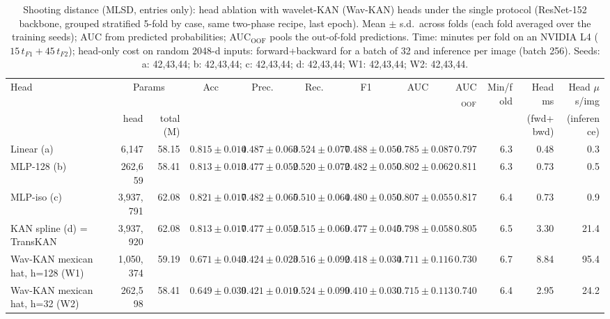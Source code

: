 \begin{table}[t]
\centering
\caption{Shooting distance (MLSD, entries only): head ablation with wavelet-KAN (Wav-KAN) heads under the single protocol (ResNet-152 backbone, grouped stratified 5-fold by case, same two-phase recipe, last epoch). Mean $\pm$ s.d.\ across folds (each fold averaged over the training seeds); AUC from predicted probabilities; AUC$_{\mathrm{OOF}}$ pools the out-of-fold predictions. Time: minutes per fold on an NVIDIA L4 ($15\,t_{F1}+45\,t_{F2}$); head-only cost on random 2048-d inputs: forward+backward for a batch of 32 and inference per image (batch 256). Seeds: a: 42,43,44; b: 42,43,44; c: 42,43,44; d: 42,43,44; W1: 42,43,44; W2: 42,43,44.}
\label{tab:wavkan_dist}
\scriptsize
\setlength{\tabcolsep}{3pt}
\begin{tabular}{lrrcccccrrrr}
\hline
Head & \multicolumn{2}{c}{Params} & Acc & Prec. & Rec. & F1 & AUC & AUC$_{\mathrm{OOF}}$ & Min/fold & Head ms & Head $\mu$s/img \\
 & head & total (M) & & & & & & & & (fwd+bwd) & (inference) \\
\hline
Linear (a) & 6{,}147 & 58.15 & $0.815 \pm 0.014$ & $0.487 \pm 0.063$ & $0.524 \pm 0.077$ & $0.488 \pm 0.056$ & $0.785 \pm 0.087$ & 0.797 & 6.3 & 0.48 & 0.3 \\
MLP-128 (b) & 262{,}659 & 58.41 & $0.813 \pm 0.013$ & $0.477 \pm 0.052$ & $0.520 \pm 0.072$ & $0.482 \pm 0.050$ & $0.802 \pm 0.062$ & 0.811 & 6.3 & 0.73 & 0.5 \\
MLP-iso (c) & 3{,}937{,}791 & 62.08 & $0.821 \pm 0.017$ & $0.482 \pm 0.065$ & $0.510 \pm 0.064$ & $0.480 \pm 0.050$ & $0.807 \pm 0.055$ & 0.817 & 6.4 & 0.73 & 0.9 \\
KAN spline (d) = TransKAN & 3{,}937{,}920 & 62.08 & $0.813 \pm 0.017$ & $0.477 \pm 0.052$ & $0.515 \pm 0.069$ & $0.477 \pm 0.045$ & $0.798 \pm 0.058$ & 0.805 & 6.5 & 3.30 & 21.4 \\
Wav-KAN mexican hat, h=128 (W1) & 1{,}050{,}374 & 59.19 & $0.671 \pm 0.043$ & $0.424 \pm 0.023$ & $0.516 \pm 0.092$ & $0.418 \pm 0.034$ & $0.711 \pm 0.116$ & 0.730 & 6.7 & 8.84 & 95.4 \\
Wav-KAN mexican hat, h=32 (W2) & 262{,}598 & 58.41 & $0.649 \pm 0.039$ & $0.421 \pm 0.019$ & $0.524 \pm 0.099$ & $0.410 \pm 0.030$ & $0.715 \pm 0.113$ & 0.740 & 6.4 & 2.95 & 24.2 \\
\hline
\end{tabular}
\end{table}

